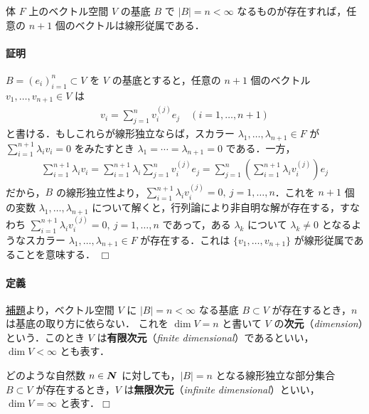 \documentclass[pandoc,base=10pt,b5j,precisetext]{bxjsarticle}
\let\oldparagraph\paragraph
\renewcommand{\paragraph}[1]{\oldparagraph{#1}\mbox{}}
\def\lt{<}
\begin{document}
体 \(F\) 上のベクトル空間 \(V\) の基底 \(B\) で \(|B| = n \lt \infty\)
なるものが存在すれば，任意の \(n + 1\) 個のベクトルは線形従属である．

\hypertarget{ux8a3cux660e}{%
\paragraph{証明}\label{ux8a3cux660e}}

\(B = (e_i)_{i = 1}^n \subset V\) を \(V\) の基底とすると，任意の
\(n + 1\) 個のベクトル \(v_1, \dotsc, v_{n+1} \in V\) は \begin{align}
v_i = \sum_{j = 1}^n v_i^{(j)} e_j \quad (i = 1, \dotsc, n + 1)
\end{align} と書ける．もしこれらが線形独立ならば，スカラー
\(\lambda_1, \dotsc, \lambda_{n+1} \in F\) が
\(\sum_{i = 1}^{n + 1} \lambda_i v_i = 0\) をみたすとき
\(\lambda_1 = \dotsb = \lambda_{n + 1} = 0\) である．一方，
\begin{align*}
\sum_{i = 1}^{n + 1} \lambda_i v_i = \sum_{i = 1}^{n + 1} \lambda_i \sum_{j = 1}^n v_i^{(j)} e_j = \sum_{j = 1}^n \left( \sum_{i = 1}^{n + 1} \lambda_i v_i^{(j)} \right) e_j
\end{align*} だから，\(B\)
の線形独立性より，\(\sum_{i = 1}^{n + 1} \lambda_i v_i^{(j)} = 0,\ j = 1, \dotsc, n\)．これを
\(n + 1\) 個の変数 \(\lambda_1, \dotsc, \lambda_{n+1}\)
について解くと，行列論により非自明な解が存在する，すなわち
\(\sum_{i = 1}^{n + 1} \lambda_i v_i^{(j)} = 0,\ j = 1, \dotsc, n\)
であって，ある \(\lambda_k\) について \(\lambda_k \neq 0\)
となるようなスカラー \(\lambda_1, \dotsc, \lambda_{n+1} \in F\)
が存在する．これは \(\{ v_1, \dotsc, v_{n + 1} \}\)
が線形従属であることを意味する． \(\Box\)

\hypertarget{dimension-of-vector-space}{%
\paragraph{定義}\label{dimension-of-vector-space}}

\protect\hyperlink{number-of-basis-is-inv}{補題}より，ベクトル空間 \(V\)
に \(|B| = n \lt \infty\) なる基底 \(B \subset V\) が存在するとき，\(n\)
は基底の取り方に依らない． これを \(\dim V = n\) と書いて \(V\)
の\textbf{次元}（\emph{dimension}）という．このとき \(V\)
は\textbf{有限次元}（\emph{finite
dimensional}）であるといい，\(\dim V \lt \infty\) とも表す．

どのような自然数 \(n \in \boldsymbol{N}\) に対しても，\(|B| = n\)
となる線形独立な部分集合 \(B \subset V\) が存在するとき，\(V\)
は\textbf{無限次元}（\emph{infinite
dimensional}）といい，\(\dim V = \infty\) と表す．\(\Box\)
\end{document}
